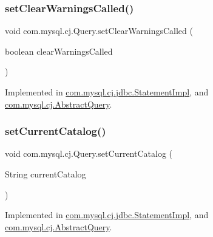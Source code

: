 \subsubsection{\texorpdfstring{set\+Clear\+Warnings\+Called()}{setClearWarningsCalled()}}
{\footnotesize\ttfamily void com.\+mysql.\+cj.\+Query.\+set\+Clear\+Warnings\+Called (\begin{DoxyParamCaption}\item[{boolean}]{clear\+Warnings\+Called }\end{DoxyParamCaption})}



Implemented in \mbox{\hyperlink{classcom_1_1mysql_1_1cj_1_1jdbc_1_1_statement_impl_a6e7f50419ea0c769393113fde7de7b87}{com.\+mysql.\+cj.\+jdbc.\+Statement\+Impl}}, and \mbox{\hyperlink{classcom_1_1mysql_1_1cj_1_1_abstract_query_a3a7177c2aad4e5a75cb3cbb556c05961}{com.\+mysql.\+cj.\+Abstract\+Query}}.

\mbox{\label{interfacecom_1_1mysql_1_1cj_1_1_query_a456b19ab936c8d8ecd49dc23aaf6a833}} 
\subsubsection{\texorpdfstring{set\+Current\+Catalog()}{setCurrentCatalog()}}
{\footnotesize\ttfamily void com.\+mysql.\+cj.\+Query.\+set\+Current\+Catalog (\begin{DoxyParamCaption}\item[{String}]{current\+Catalog }\end{DoxyParamCaption})}



Implemented in \mbox{\hyperlink{classcom_1_1mysql_1_1cj_1_1jdbc_1_1_statement_impl_a30dda4ad8c6bc0be8eb3c926c9a1e0f1}{com.\+mysql.\+cj.\+jdbc.\+Statement\+Impl}}, and \mbox{\hyperlink{classcom_1_1mysql_1_1cj_1_1_abstract_query_abf73f90a5df9f9b8efc2cc2aa477dfd8}{com.\+mysql.\+cj.\+Abstract\+Query}}.

\mbox{\label{interfacecom_1_1mysql_1_1cj_1_1_query_ad50d1ecd73b6b2cac60cff6bec83bfbf}} 
